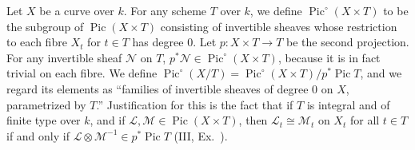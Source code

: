{Let $X$ be a curve over $k$. For any scheme $T$ over $k$, we define $\operatorname{Pic}^{\circ}(X\times T)$ to be the subgroup of $\operatorname{Pic}(X\times T)$ consisting of invertible sheaves whose restriction to each fibre $X_t$ for $t\in T$ has degree $0$. Let $p\colon X\times T\to T$ be the second projection. For any invertible sheaf $\mathcal N$ on $T$, $p^*\mathcal N\in\operatorname{Pic}^{\circ}(X\times T)$, because it is in fact trivial on each fibre. We define $\operatorname{Pic}^{\circ}(X/T)=\operatorname{Pic}^{\circ}(X\times T)/p^*\operatorname{Pic}T$, and we regard its elements as \textquotedblleft{}families of invertible sheaves of degree $0$ on $X$, parametrized by $T$.\textquotedblright{} Justification for this is the fact that if $T$ is integral and of finite type over $k$, and if $\mathcal L,\mathcal M\in\operatorname{Pic}(X\times T)$, then $\mathcal L_t\cong\mathcal M_t$ on $X_t$ for all $t\in T$ if and only if $\mathcal L\otimes\mathcal M^{-1}\in p^*\operatorname{Pic}T$ (III, Ex.~).
}
